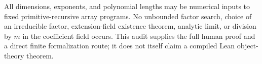 All dimensions, exponents, and polynomial lengths may be numerical inputs
to fixed primitive-recursive array programs.  No unbounded factor search,
choice of an irreducible factor, extension-field existence theorem,
analytic limit, or division by \(m\) in the coefficient field occurs.
This audit supplies the full human proof and a direct finite formalization
route; it does not itself claim a compiled Lean object-theory theorem.
